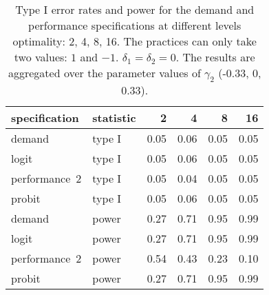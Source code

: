\begin{table}[ht]
\centering
\begingroup\footnotesize
\begin{tabular}{llrrrr}
  \hline
specification & statistic & 2 & 4 & 8 & 16 \\ 
  \hline
demand & type I & 0.05 & 0.06 & 0.05 & 0.05 \\ 
  logit & type I & 0.05 & 0.06 & 0.05 & 0.05 \\ 
  performance~2 & type I & 0.05 & 0.04 & 0.05 & 0.05 \\ 
  probit & type I & 0.05 & 0.06 & 0.05 & 0.05 \\ 
  demand & power & 0.27 & 0.71 & 0.95 & 0.99 \\ 
  logit & power & 0.27 & 0.71 & 0.95 & 0.99 \\ 
  performance~2 & power & 0.54 & 0.43 & 0.23 & 0.10 \\ 
  probit & power & 0.27 & 0.71 & 0.95 & 0.99 \\ 
   \hline
\end{tabular}
\endgroup
\caption{Type I error rates and power for the demand and 
  performance specifications at different levels optimality: 2, 
  4, 8, 16. The practices can only take two values: $1$ and $-1$.
  $\delta_1 = \delta_2 = 0$. The results are aggregated over 
  the parameter values of $\gamma_2$ (-0.33, 0, 0.33).} 
\label{discrete-table}
\end{table}
